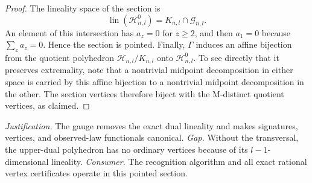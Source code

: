 \documentclass{article}
\begin{document}
\begin{proof}
The lineality space of the section is
\[\operatorname{lin}(\mathcal H^0_{n,l})=K_{n,l}\cap\mathcal G_{n,l}.\]
An element of this intersection has \(a_z=0\) for \(z\ge2\), and then \(a_1=0\) because \(\sum_z a_z=0\). Hence the section is pointed. Finally, \(\Gamma\) induces an affine bijection from the quotient polyhedron \(\mathcal H_{n,l}/K_{n,l}\) onto \(\mathcal H^0_{n,l}\). To see directly that it preserves extremality, note that a nontrivial midpoint decomposition in either space is carried by this affine bijection to a nontrivial midpoint decomposition in the other. The section vertices therefore biject with the M-distinct quotient vertices, as claimed.
\end{proof}
\par\smallskip\noindent \textit{Justification.} The gauge removes the exact dual lineality and makes signatures, vertices, and observed-law functionals canonical. \textit{Gap.} Without the transversal, the upper-dual polyhedron has no ordinary vertices because of its \(l-1\)-dimensional lineality. \textit{Consumer.} The recognition algorithm and all exact rational vertex certificates operate in this pointed section.
\end{document}
